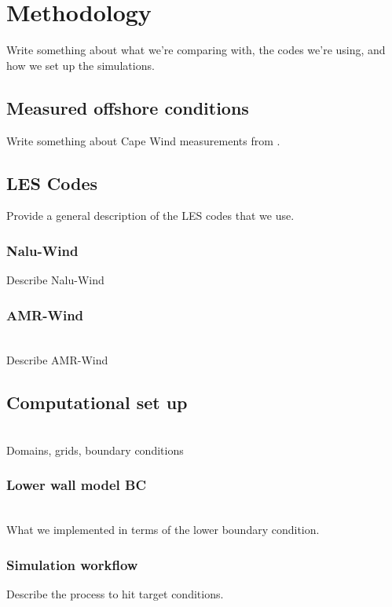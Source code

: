 \section{Methodology}
Write something about what we're comparing with, the codes we're
using, and how we set up the simulations.

\subsection{Measured offshore conditions}

Write something about Cape Wind measurements from \cite{archer2016predominance}.

\subsection{LES Codes}
Provide a general description of the LES codes that we use.

\subsubsection{Nalu-Wind}
Describe Nalu-Wind

\subsubsection{AMR-Wind}
\\
Describe AMR-Wind

\subsection{Computational set up}
\\
Domains, grids, boundary conditions

\subsubsection{Lower wall model BC}
\\
What we implemented in terms of the lower boundary condition.

\subsubsection{Simulation workflow}
Describe the process to hit target conditions.




